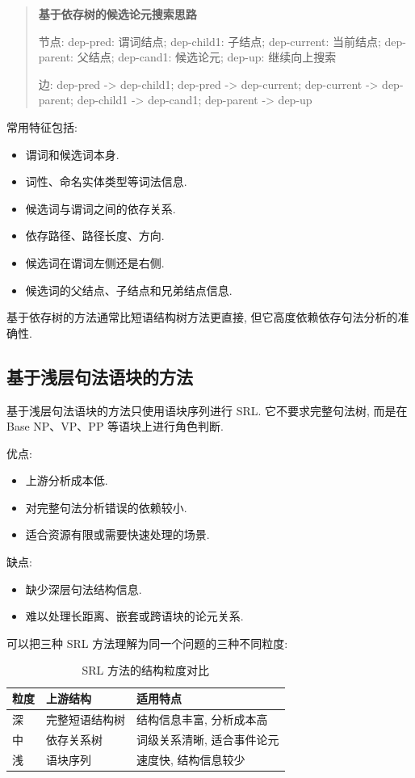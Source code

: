 \begin{quote}
\small
\textbf{基于依存树的候选论元搜索思路}
\par 节点: dep-pred: 谓词结点; dep-child1: 子结点; dep-current: 当前结点; dep-parent: 父结点; dep-cand1: 候选论元; dep-up: 继续向上搜索
\par 边: dep-pred -\textgreater{} dep-child1; dep-pred -\textgreater{} dep-current; dep-current -\textgreater{} dep-parent; dep-child1 -\textgreater{} dep-cand1; dep-parent -\textgreater{} dep-up
\end{quote}

常用特征包括:

\begin{itemize}
\item 谓词和候选词本身.
\item 词性、命名实体类型等词法信息.
\item 候选词与谓词之间的依存关系.
\item 依存路径、路径长度、方向.
\item 候选词在谓词左侧还是右侧.
\item 候选词的父结点、子结点和兄弟结点信息.
\end{itemize}

基于依存树的方法通常比短语结构树方法更直接,
但它高度依赖依存句法分析的准确性.

\subsection{基于浅层句法语块的方法}


基于浅层句法语块的方法只使用语块序列进行 SRL.
它不要求完整句法树, 而是在 Base NP、VP、PP 等语块上进行角色判断.

优点:

\begin{itemize}
\item 上游分析成本低.
\item 对完整句法分析错误的依赖较小.
\item 适合资源有限或需要快速处理的场景.
\end{itemize}

缺点:

\begin{itemize}
\item 缺少深层句法结构信息.
\item 难以处理长距离、嵌套或跨语块的论元关系.
\end{itemize}

可以把三种 SRL 方法理解为同一个问题的三种不同粒度:

\begin{table}[H]
\centering
\begingroup
\setlength{\tabcolsep}{2pt}
\small
\caption{SRL 方法的结构粒度对比}
\begin{tabular}{|p{}|p{}|p{}|}
\hline
粒度 & 上游结构 & 适用特点 \\ \hline
深 & 完整短语结构树 & 结构信息丰富, 分析成本高 \\ \hline
中 & 依存关系树 & 词级关系清晰, 适合事件论元 \\ \hline
浅 & 语块序列 & 速度快, 结构信息较少 \\ \hline
\end{tabular}
\endgroup
\end{table}
